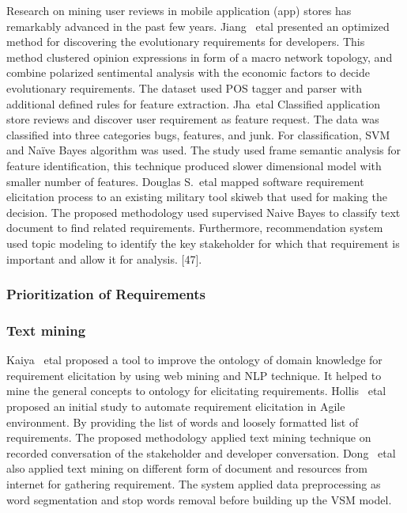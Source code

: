 Research on mining user reviews in mobile application (app) stores has remarkably advanced in the past few years. Jiang ~etal \cite{Jiang:2014} presented an optimized method for discovering the evolutionary requirements for developers. This method clustered opinion expressions in form of a macro network topology, and combine polarized sentimental analysis with the economic factors to decide evolutionary requirements. The dataset used POS tagger and parser with additional defined rules for feature extraction.                   Jha~etal \cite{Jha:2017} Classified application store reviews and discover user requirement as feature request. The data was classified into three categories bugs, features, and junk. For classification, SVM and Naïve Bayes algorithm was used. The study used frame semantic analysis for feature identification, this technique produced slower dimensional model with smaller number of features. Douglas S.~etal \cite{Douglas:S2008} mapped software requirement elicitation process to an existing military tool skiweb that used for making the decision. The proposed methodology used supervised Naive Bayes to classify text document to find related requirements. Furthermore, recommendation system used topic modeling to identify the key stakeholder for which that requirement is important and allow it for analysis.  [47]. \\

\subsubsection{Prioritization of Requirements} 

\subsubsection{Text mining}
Kaiya ~etal \cite {Kaiya:2010} proposed a tool to improve the ontology of domain knowledge for requirement elicitation by using web mining and NLP technique. It helped to mine the general concepts to ontology for elicitating requirements. Hollis ~etal   \cite{Hollis2017} proposed an initial study to automate requirement elicitation in Agile environment. By providing the list of words and loosely formatted list of requirements. The proposed methodology applied text mining technique on recorded conversation of the stakeholder and developer conversation. Dong ~etal \cite{dong2010}  also applied text mining on different form of  document and resources from internet for  gathering requirement. The system applied data preprocessing as word segmentation and stop words removal before building up the VSM model.
